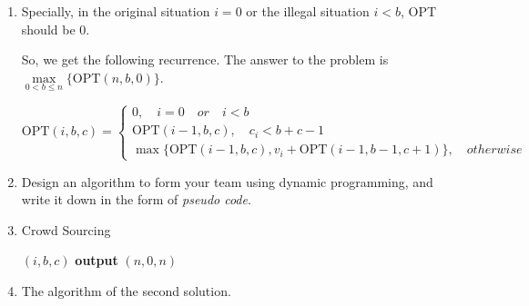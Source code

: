 \documentclass[12pt,a4paper]{article}
\makeatletter
\newtheorem*{solution}{Solution}
\theoremstyle{definition}
\renewenvironment{solution}[1][Solution] {\par\pushQED{\qed}\normalfont\topsep6\p@\@plus6\p@\relax\trivlist\item[\hskip\labelsep\bfseries#1\@addpunct{.}]\ignorespaces}{\popQED\endtrivlist\@endpefalse} \makeatother
\makeatother
\begin{document}
\begin{enumerate}
\begin{enumerate}
\begin{solution}
	Specially, in the original situation $i=0$ or the illegal situation $i<b$, OPT should be $0$.
	
	So, we get the following recurrence. The answer to the problem is $\max\limits_{0<b\leq n}\{\text{OPT}(n,b,0)\}$.
	
	$$\text{OPT}(i,b,c)=\begin{cases}
	0,\quad i=0\quad or\quad i<b\\
	\text{OPT}(i-1,b,c),\quad c_i<b+c-1\\
	\max\{\text{OPT}(i-1,b,c),v_i+\text{OPT}(i-1,b-1,c+1)\},\quad otherwise
	\end{cases}$$
	
\end{solution}

\item
Design an algorithm to form your team using dynamic programming, and write it down in the form of \emph{pseudo code}.

\newpage
\begin{solution}\quad
	
	\begin{minipage}{0.9\textwidth}
		\begin{algorithm}[H]
			\BlankLine
			\caption{Crowd Sourcing}
			\BlankLine
			\BlankLine
			\opt$(i,b,c)$
			\BlankLine
			\textbf{output} \opt$(n,0,n)$\;
		\end{algorithm}
		
	\end{minipage}
\end{solution}

\newpage
\begin{solution} The algorithm of the second solution.
	

\end{solution}
\end{enumerate}
\end{enumerate}
\end{document}
